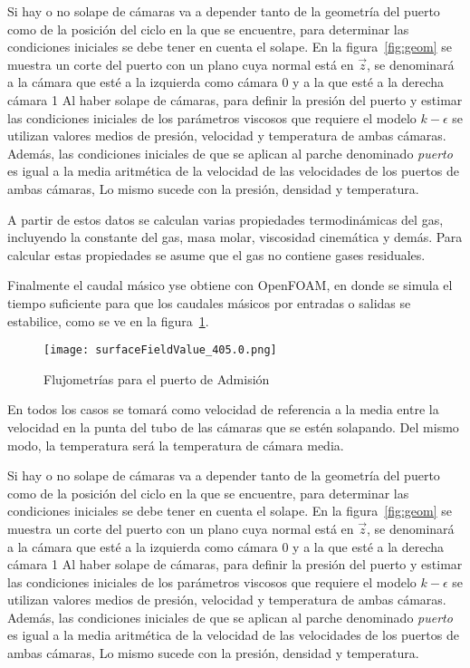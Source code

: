 Si hay o no solape de cámaras va a depender tanto de la geometría del puerto
como de la posición del ciclo en la que se encuentre, para determinar las
condiciones iniciales se debe tener en cuenta el solape.
%
En la figura~\ref{fig:geom} se muestra un corte del puerto con un plano cuya
normal está en $\vec{z}$, se denominará a la cámara que esté a la izquierda
como cámara 0 y a la que esté a la derecha cámara 1
%
Al haber solape de cámaras, para definir la presión del puerto y estimar las
condiciones iniciales de los parámetros viscosos que requiere el modelo
$k-\epsilon$ se utilizan valores medios de presión, velocidad y temperatura de
ambas cámaras.
%
Además, las condiciones iniciales de que se aplican al parche denominado
\emph{puerto} es igual a la media aritmética de la velocidad de las velocidades
de los puertos de ambas cámaras, Lo mismo sucede con la presión, densidad y
temperatura.

A partir de estos datos se calculan varias propiedades termodinámicas del gas,
incluyendo la constante del gas, masa molar, viscosidad cinemática y demás.
%
Para calcular estas propiedades se asume que el gas no contiene gases
residuales.

Finalmente el caudal másico yse obtiene con OpenFOAM, en donde se simula el
tiempo suficiente para que los caudales másicos por entradas o salidas se
estabilice, como se ve en la figura~\ref{fig:caudalMasico}.

\begin{figure}
    \centering
    \texttt{[image: surfaceFieldValue\_405.0.png]}
    \caption{Flujometrías para el puerto de Admisión}\label{fig:caudalMasico}
\end{figure}
En todos los casos se tomará como velocidad de referencia a la media entre la
velocidad en la punta del tubo de las cámaras que se estén solapando.
%
Del mismo modo, la temperatura será la temperatura de cámara media.

Si hay o no solape de cámaras va a depender tanto de la geometría del puerto
como de la posición del ciclo en la que se encuentre, para determinar las
condiciones iniciales se debe tener en cuenta el solape.
%
En la figura~\ref{fig:geom} se muestra un corte del puerto con un plano cuya
normal está en $\vec{z}$, se denominará a la cámara que esté a la izquierda
como cámara 0 y a la que esté a la derecha cámara 1
%
Al haber solape de cámaras, para definir la presión del puerto y estimar las
condiciones iniciales de los parámetros viscosos que requiere el modelo
$k-\epsilon$ se utilizan valores medios de presión, velocidad y temperatura de
ambas cámaras.
%
Además, las condiciones iniciales de que se aplican al parche denominado
\emph{puerto} es igual a la media aritmética de la velocidad de las velocidades
de los puertos de ambas cámaras, Lo mismo sucede con la presión, densidad y
temperatura.
